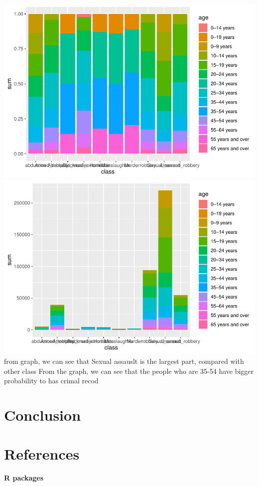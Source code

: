 \documentclass[11pt,a4paper,]{article}
\begin{document}
\includegraphics{report_files/figure-latex/graph-1.pdf} \includegraphics{report_files/figure-latex/graph-2.pdf}
from graph, we can see that Sexual assauslt is the largest part, compared with other class
From the graph, we can see that the people who are 35-54 have bigger probability to has crimal recod

\clearpage

\section*{Conclusion}

\section*{References}

\textbf{R packages}
\end{document}
